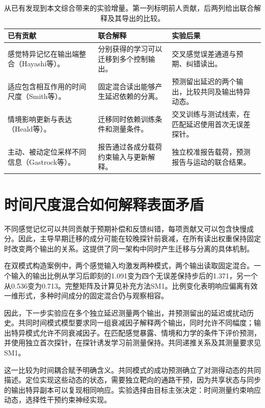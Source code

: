 \documentclass[11pt,a4paper]{article}
\begin{document}
\begin{table}[!htbp]\small\caption{从已有发现到本文综合带来的实验增量。第一列标明前人贡献，后两列给出联合解释及其导出的比较。}\label{tab:synthesis}
\begin{tabularx}{\textwidth}{>{\raggedright\arraybackslash}X>{\raggedright\arraybackslash}X>{\raggedright\arraybackslash}X}\toprule
\textbf{已有贡献} & \textbf{联合解释} & \textbf{实验后果}\\\midrule
感觉特异记忆在输出端整合（Hayashi等）。 & 分别获得的学习可以迁移到多个控制输出。 & 交叉感觉误差通道与预期、纠错读出。\\[6pt]
适应包含相互作用的时间尺度（Smith等）。 & 固定混合读出能够产生延迟依赖的分离。 & 预测留出延迟的两个输出，比较共同及输出特异动态。\\[6pt]
情境影响更新与表达（Heald等）。 & 迁移同时依赖训练条件和测量条件。 & 交叉训练与测试线索，在匹配延迟使用首次无误差探针。\\[6pt]
主动、被动定位采样不同信息（Gastrock等）。 & 报告通过各成分载荷约束输入与更新解释。 & 独立校准报告载荷，预测报告与运动的联合结果。\\[6pt]
\bottomrule\end{tabularx}\end{table}
\section{时间尺度混合如何解释表面矛盾}
不同感觉记忆可以共同贡献于预期补偿和反馈纠错，每项贡献又可以包含快慢成分。因此，主导早期迁移的成分可能在较晚探针前衰减，在所有读出权重保持固定时改变两个输出的关系。这提供了同一架构中同时产生迁移与分离的具体机制。\cite{hayashi2020,smith2006}

在双模式构造案例中，两个感觉输入均激发两种模式，两个输出读取固定混合。一个输入的输出比例从学习后即刻的1.091变为四个无误差保持步后的1.371，另一个从0.536变为0.713。完整矩阵及计算见补充方法SM1。比例变化表明响应偏离有效一维形式，多种时间成分的固定混合仍与观察相容。

因此，下一步实验应在多个独立延迟测量两个输出，并预测留出的延迟或扰动历史。共同时间模式模型要求同一组衰减因子解释两个输出，同时允许不同幅度；输出特异模式允许不同衰减因子。在匹配感觉暴露、情境和力学的条件下评价预测，并使用独立首次探针，在探针诱发学习前测量保持。共同递推关系及其测量要求见SM1。\cite{unlearning2016}

这一比较为时间耦合赋予明确含义。共同模式的成功预测确立了对测得动态的共同描述。定位实现这些动态的状态，需要独立靶向的通路干预，因为共享状态与同步的输出特异副本可以复现相同响应。实验选择由目标主张决定：时间测量约束响应动态，选择性干预约束神经实现。
\end{document}
